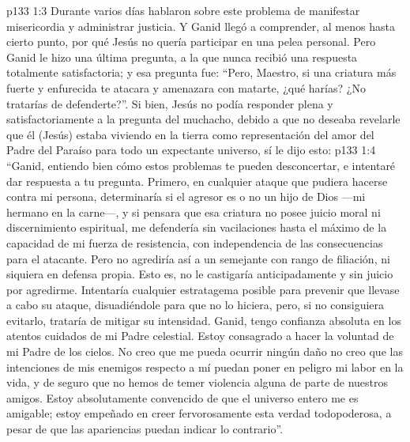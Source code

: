 \vs p133 1:3 Durante varios días hablaron sobre este problema de manifestar misericordia y administrar justicia. Y Ganid llegó a comprender, al menos hasta cierto punto, por qué Jesús no quería participar en una pelea personal. Pero Ganid le hizo una última pregunta, a la que nunca recibió una respuesta totalmente satisfactoria; y esa pregunta fue: “Pero, Maestro, si una criatura más fuerte y enfurecida te atacara y amenazara con matarte, ¿qué harías? ¿No tratarías de defenderte?”. Si bien, Jesús no podía responder plena y satisfactoriamente a la pregunta del muchacho, debido a que no deseaba revelarle que él (Jesús) estaba viviendo en la tierra como representación del amor del Padre del Paraíso para todo un expectante universo, sí le dijo esto:
\vs p133 1:4 “Ganid, entiendo bien cómo estos problemas te pueden desconcertar, e intentaré dar respuesta a tu pregunta. Primero, en cualquier ataque que pudiera hacerse contra mi persona, determinaría si el agresor es o no un hijo de Dios ---mi hermano en la carne---, y si pensara que esa criatura no posee juicio moral ni discernimiento espiritual, me defendería sin vacilaciones hasta el máximo de la capacidad de mi fuerza de resistencia, con independencia de las consecuencias para el atacante. Pero no agrediría así a un semejante con rango de filiación, ni siquiera en defensa propia. Esto es, no le castigaría anticipadamente y sin juicio por agredirme. Intentaría cualquier estratagema posible para prevenir que llevase a cabo su ataque, disuadiéndole para que no lo hiciera, pero, si no consiguiera evitarlo, trataría de mitigar su intensidad. Ganid, tengo confianza absoluta en los atentos cuidados de mi Padre celestial. Estoy consagrado a hacer la voluntad de mi Padre de los cielos. No creo que me pueda ocurrir ningún daño  no creo que las intenciones de mis enemigos respecto a mí puedan poner en peligro mi labor en la vida, y de seguro que no hemos de temer violencia alguna de parte de nuestros amigos. Estoy absolutamente convencido de que el universo entero me es amigable; estoy empeñado en creer fervorosamente esta verdad todopoderosa, a pesar de que las apariencias puedan indicar lo contrario”.
